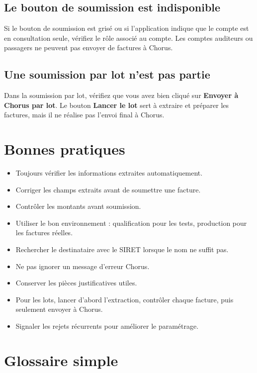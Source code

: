 \documentclass[11pt,a4paper]{article}
\begin{document}
\subsection{Le bouton de soumission est indisponible}

Si le bouton de soumission est grisé ou si l'application indique que le compte
est en consultation seule, vérifiez le rôle associé au compte. Les comptes
auditeurs ou passagers ne peuvent pas envoyer de factures à Chorus.

\subsection{Une soumission par lot n'est pas partie}

Dans la soumission par lot, vérifiez que vous avez bien cliqué sur
\textbf{Envoyer à Chorus par lot}. Le bouton \textbf{Lancer le lot} sert à
extraire et préparer les factures, mais il ne réalise pas l'envoi final à Chorus.

\section{Bonnes pratiques}

\begin{itemize}
  \item Toujours vérifier les informations extraites automatiquement.
  \item Corriger les champs extraits avant de soumettre une facture.
  \item Contrôler les montants avant soumission.
  \item Utiliser le bon environnement : qualification pour les tests, production
        pour les factures réelles.
  \item Rechercher le destinataire avec le SIRET lorsque le nom ne suffit pas.
  \item Ne pas ignorer un message d'erreur Chorus.
  \item Conserver les pièces justificatives utiles.
  \item Pour les lots, lancer d'abord l'extraction, contrôler chaque facture,
        puis seulement envoyer à Chorus.
  \item Signaler les rejets récurrents pour améliorer le paramétrage.
\end{itemize}

\section{Glossaire simple}
\end{document}
